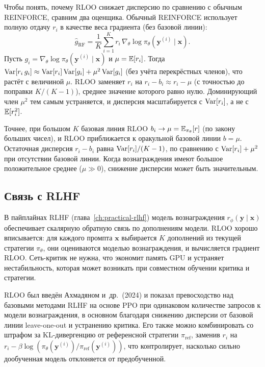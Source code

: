 
Чтобы понять, почему RLOO снижает дисперсию по сравнению с обычным REINFORCE, сравним два оценщика. Обычный REINFORCE использует полную отдачу $r_i$ в качестве веса градиента (без базовой линии):
\[
\hat g_{\text{RF}} = \frac{1}{K}\sum_{i=1}^K r_i\, \nabla_\theta \log \pi_\theta(\mathbf{y}^{(i)} \mid \mathbf{x}).
\]
Пусть $g_i = \nabla_\theta \log \pi_\theta(\mathbf{y}^{(i)} \mid \mathbf{x})$ и $\mu = \operatorname{\mathbb{E}}[r_i]$. Тогда $\operatorname{Var}[r_i\, g_i] \approx \operatorname{Var}[r_i] \operatorname{Var}[g_i] + \mu^2 \operatorname{Var}[g_i]$ (без учёта перекрёстных членов), что растёт с величиной $\mu$. RLOO заменяет $r_i$ на $r_i - b_i \approx r_i - \mu$ (с точностью до поправки $K/(K-1)$), среднее значение которого равно нулю. Доминирующий член $\mu^2$ тем самым устраняется, и дисперсия масштабируется с $\operatorname{Var}[r_i]$, а не с $\operatorname{\mathbb{E}}[r_i^2]$.

Точнее, при большом $K$ базовая линия RLOO $b_i \to \mu = \operatorname{\mathbb{E}}_{\pi_\theta}[r]$ (по закону больших чисел), и RLOO приближается к оракульной базовой линии $b = \mu$. Остаточная дисперсия $r_i - b_i$ равна $\operatorname{Var}[r_i] / (K-1)$, по сравнению с $\operatorname{Var}[r_i] + \mu^2$ при отсутствии базовой линии. Когда вознаграждения имеют большое положительное среднее ($\mu \gg 0$), снижение дисперсии может быть значительным.

\subsection{Связь с RLHF}


В пайплайнах RLHF (глава~\ref{ch:practical-rlhf}) модель вознаграждения $r_\phi(\mathbf{y} \mid \mathbf{x})$ обеспечивает скалярную обратную связь по дополнениям модели. RLOO хорошо вписывается: для каждого промпта $\mathbf{x}$ выбирается $K$ дополнений из текущей стратегии $\pi_\theta$, они оцениваются моделью вознаграждения, и вычисляется градиент RLOO. Сеть-критик не нужна, что экономит память GPU и устраняет нестабильность, которая может возникать при совместном обучении критика и стратегии.

RLOO был введён Ахмадяном и~др.\ (2024) и показал превосходство над базовыми методами RLHF на основе PPO при одинаковом количестве запросов к модели вознаграждения, в основном благодаря снижению дисперсии от базовой линии leave-one-out и устранению критика. Его также можно комбинировать со штрафом за KL-дивергенцию от референсной стратегии $\pi_{\text{ref}}$, заменив $r_i$ на $r_i - \beta \log(\pi_\theta(\mathbf{y}^{(i)}) / \pi_{\text{ref}}(\mathbf{y}^{(i)}))$, что контролирует, насколько сильно дообученная модель отклоняется от предобученной.

